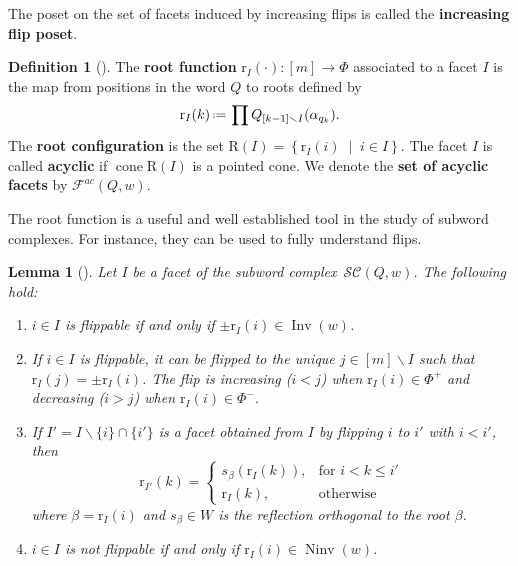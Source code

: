\documentclass{amsart}
\newtheorem{lemma}[theorem]{Lemma}
\theoremstyle{definition}
\newtheorem{definition}[theorem]{Definition}
\newcommand{\set}[2]{\left\{ #1 \;\middle|\; #2 \right\}} %
\newcommand{\eqdef}{\mbox{\,\raisebox{0.2ex}{\scriptsize\ensuremath{\mathrm:}}\ensuremath{=}\,}} %
\DeclareMathOperator{\cone}{cone} %
\DeclareMathOperator{\Inv}{Inv} %
\DeclareMathOperator{\Ninv}{Ninv} %
\newcommand{\defn}[1]{\textbf{\textsf{\color{PineGreen} #1}}} %
\newcommand{\subwordComplex}{\mathcal{SC}} %
\newcommand{\Roots}{\mathrm{R}} %
\newcommand{\rootFunction}[2]{\mathrm{r}_{#1}(#2)} %
\newcommand{\subwordAcyclicFacets}{\mathcal{F}^{ac}} %
\begin{document}
The poset on the set of facets induced by increasing flips is called the \defn{increasing flip poset}.

\begin{definition}[{\cite{CeballosLabbeStump}}]
    The \defn{root function} $\rootFunction{I}{\cdot}:[m]\rightarrow \Phi$ associated to a facet $I$ is the map from positions in the word $Q$ to roots defined by 
    \[
    \rootFunction{I}{k} \eqdef \prod Q_{[k-1]\smallsetminus I}(\alpha_{q_k}).
    \]
    The \defn{root configuration} is the set $\Roots(I)=\set{\rootFunction{I}{i}}{i\in I}$.
    The facet $I$ is called \defn{acyclic} if $\cone \Roots(I)$ is a pointed cone.
    We denote the \defn{set of acyclic facets} by $\subwordAcyclicFacets(Q,w)$.
\end{definition}

The root function is a useful and well established tool in the study of subword complexes.
For instance, they can be used to fully understand flips.

\begin{lemma}[{\cite{CeballosLabbeStump, KnutsonMiller-subwordComplex}}]
\label{lem_rootfunction_flips}
Let $I$ be a facet of the subword complex~$\subwordComplex(Q,w)$.
The following hold:
\begin{enumerate}
    \item $i \in I$ is flippable if and only if $\pm \rootFunction{I}{i} \in \Inv(w)$.
    \item If $i \in I$ is flippable, it can be flipped to the unique $j\in [m]\smallsetminus I$ such that $\rootFunction{I}{j} = \pm\rootFunction{I}{i}$.
    The flip is increasing ($i<j$) when $\rootFunction{I}{i}\in \Phi^+$ and decreasing ($i>j$) when $\rootFunction{I}{i}\in \Phi^-$.\label{lem_rootfunction_flips2}
    \item If $I'=I\smallsetminus \{i\}\cap \{i'\}$ is a facet obtained from $I$ by flipping $i$ to $i'$ with $i<i'$, then
    \begin{equation}\label{eq_rootfunction_flip}
         \rootFunction{I'}{k} = 
  \begin{cases}
    s_\beta(\rootFunction{I}{k}), & \text{for } i < k \leq i' \\
    \rootFunction{I}{k}, & \text{otherwise}
  \end{cases}
    \end{equation}
    where $\beta=\rootFunction{I}{i}$ and $s_\beta\in W$ is the reflection orthogonal to the root $\beta$.
    \item $i \in I$ is not flippable if and only if $\rootFunction{I}{i}\in \Ninv(w)$.
\end{enumerate}
\end{lemma}
\end{document}
